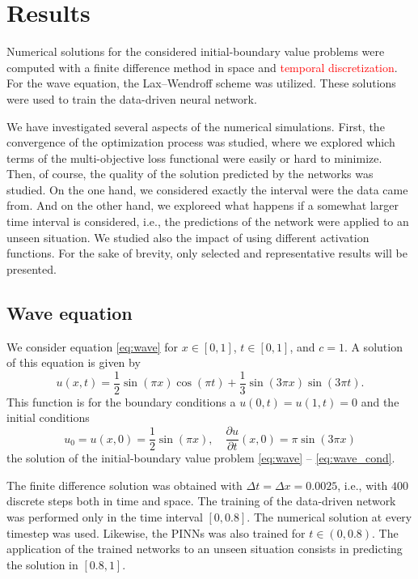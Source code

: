 \section{Results}
\label{sec:results}

Numerical solutions for the considered initial-boundary value problems were computed with a finite 
difference method in space and \textcolor{red}{temporal discretization}. 
For the wave equation, the Lax--Wendroff scheme \cite{LW60,LeV92} was utilized. These solutions were 
used to train the data-driven neural network. 

We have investigated several aspects of the numerical simulations. First, the convergence of the 
optimization process was studied, where we explored which terms of the multi-objective 
loss functional were easily or hard to minimize. Then, of course, the quality of the solution 
predicted by the networks was studied. On the one hand, we considered exactly the interval were the 
data came from. And on the other hand, we exploreed what happens if a somewhat larger time 
interval is considered, i.e., the predictions of the network were applied to an unseen situation. 
We studied also the impact of using different activation functions. For the sake of brevity, only 
selected and representative results will be presented. 


\subsection{Wave equation}
\label{subsec:wave_res}

We consider equation \eqref{eq:wave} for $x \in [0,1]$, $t \in [0,1]$, and $c =1$.  A solution of this 
equation is given by 
\[
u(x,t) = \frac{1}{2} \sin (\pi x) \cos(\pi t) + \frac{1}{3} \sin (3\pi x) \sin (3 \pi t).  
\]
This function is for the boundary conditions a $u(0,t) = u(1,t) =  0$ and the initial 
conditions 
\[
u_0  = u(x,0)  = \frac{1}{2} \sin (\pi x), \quad \frac{\partial u}{\partial t}(x,0) = \pi  \sin (3 \pi x)
\]
the solution of the initial-boundary value problem \eqref{eq:wave} -- \eqref{eq:wave_cond}.


The finite difference solution was obtained with $\Delta t = \Delta x = 0.0025$, i.e., with $400$ 
discrete steps both in time and space. The training of the data-driven network was performed only 
in the time interval $[0,0.8]$. The numerical solution at every timestep was used. Likewise, 
the PINNs was also trained for $t \in (0,0.8)$. The application of the trained networks to an 
unseen situation consists in predicting the solution in $[0.8,1]$. 

